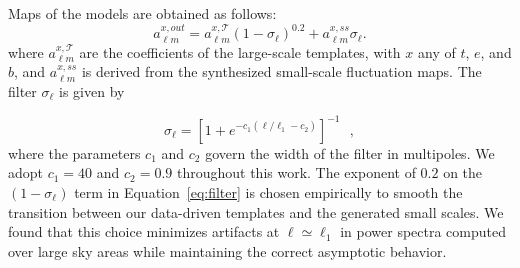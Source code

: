 \documentclass[twocolumn]{aastex631}
\begin{document}


 


 
Maps of the models are obtained as follows: 
\begin{equation}
    a_{\ell m }^{x, out}=  a_{\ell m }^{x, \mathcal{T}} \left(1-\sigma_\ell\right)^{0.2} + a_{\ell m }^{x, ss} \sigma_\ell. \label{eq:filter}
\end{equation}
where $a_{\ell m }^{x, \mathcal{T}}$ are the coefficients of the large-scale templates, with $x$ any of $t$, $e$, and $b$, and $a_{\ell m }^{x, ss}$ is derived from the synthesized small-scale fluctuation maps. The filter $\sigma_\ell$ is given by

\begin{equation}
\sigma_\ell  = \left[1+  e^{ -c_1 (\ell/ \ell_1  -c_2 )}\right]^{-1}  
~~~,
\end{equation}
where the parameters $c_1$ and $c_2$ govern the width of the filter in multipoles. We adopt $c_1=40$ and $c_2=0.9$ throughout this work. The exponent of $0.2$ on the $\left(1-\sigma_\ell\right)$ term in Equation~\ref{eq:filter} is chosen empirically to smooth the transition between our data-driven templates and the generated small scales. We found that this choice minimizes artifacts at $\ell \simeq \ell_1$ in power spectra computed over large sky areas while maintaining the correct asymptotic behavior.
\end{document}
